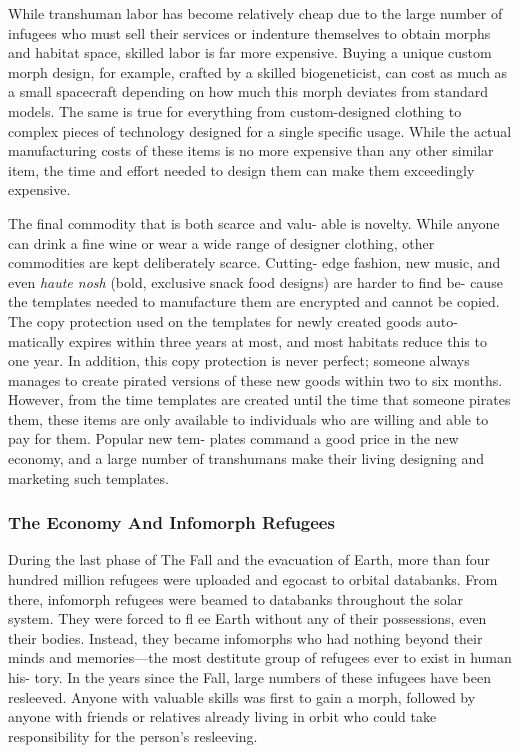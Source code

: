 While transhuman labor has become relatively 
cheap due to the large number of infugees who must 
sell their services or indenture themselves to obtain 
morphs and habitat space, skilled labor is far more 
expensive. Buying a unique custom morph design, for 
example, crafted by a skilled biogeneticist, can cost as 
much as a small spacecraft depending on how much 
this morph deviates from standard models. The same 
is true for everything from custom-designed clothing 
to complex pieces of technology designed for a single 
specific usage. While the actual manufacturing costs 
of these items is no more expensive than any other 
similar item, the time and effort needed to design 
them can make them exceedingly expensive.

The final commodity that is both scarce and valu-
able is novelty. While anyone can drink a fine wine 
or wear a wide range of designer clothing, other 
commodities are kept deliberately scarce. Cutting-
edge fashion, new music, and even \textit{haute nosh }(bold, 
exclusive snack food designs) are harder to find be-
cause the templates needed to manufacture them are 
encrypted and cannot be copied. The copy protection 
used on the templates for newly created goods auto-
matically expires within three years at most, and most 
habitats reduce this to one year. In addition, this copy 
protection is never perfect; someone always manages 
to create pirated versions of these new goods within 
two to six months. However, from the time templates 
are created until the time that someone pirates them, 
these items are only available to individuals who are 
willing and able to pay for them. Popular new tem-
plates command a good price in the new economy, 
and a large number of transhumans make their living 
designing and marketing such templates.

\subsubsection{The Economy And Infomorph Refugees}

During the last phase of The Fall and the evacuation 
of Earth, more than four hundred million refugees 
were uploaded and egocast to orbital databanks. From 
there, infomorph refugees were beamed to databanks 
throughout the solar system. They were forced to fl ee 
Earth without any of their possessions, even their 
bodies. Instead, they became infomorphs who had 
nothing beyond their minds and memories—the most 
destitute group of refugees ever to exist in human his-
tory. In the years since the Fall, large numbers of these 
infugees have been resleeved. Anyone with valuable 
skills was first to gain a morph, followed by anyone 
with friends or relatives already living in orbit who 
could take responsibility for the person's resleeving.


